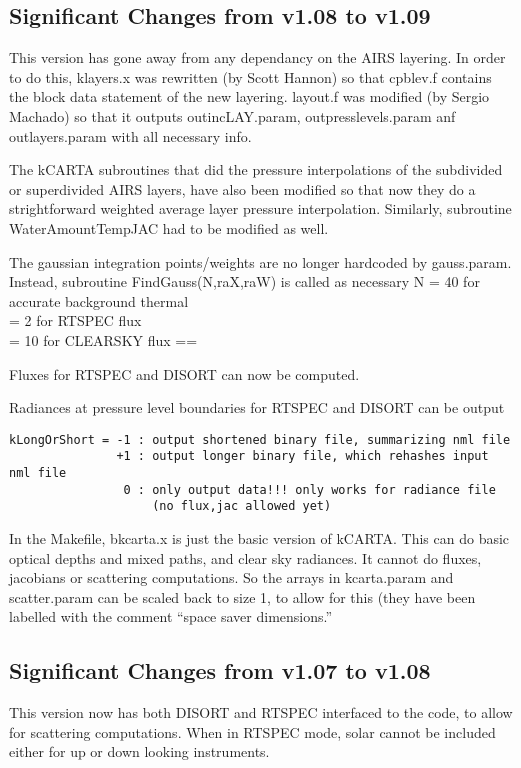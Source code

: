 \documentclass[12pt]{article}
\begin{document}
{{{{\subsection{Significant Changes from v1.08 to v1.09}
This version has gone away from any dependancy on the AIRS layering. In order 
to do this, klayers.x was rewritten (by Scott Hannon) so that cpblev.f 
contains the block data statement of the new layering. layout.f was modified 
(by Sergio Machado) so that it outputs outincLAY.param, outpresslevels.param 
anf outlayers.param with all necessary info. 
 
The kCARTA subroutines that did the pressure interpolations of the subdivided 
or superdivided AIRS layers, have also been modified so that now they do a  
strightforward weighted average layer pressure interpolation. 
 Similarly, subroutine WaterAmountTempJAC had to be modified as well. 
 
The gaussian integration points/weights are no longer hardcoded by 
gauss.param. Instead, subroutine FindGauss(N,raX,raW) is called as necessary 
N = 40  for accurate background thermal  \\
  = 2   for RTSPEC flux \\
  = 10  for CLEARSKY flux ==
 
Fluxes for RTSPEC and DISORT can now be computed. 
 
Radiances at pressure level boundaries for RTSPEC and DISORT can be output 

\begin{verbatim}
kLongOrShort = -1 : output shortened binary file, summarizing nml file 
               +1 : output longer binary file, which rehashes input nml file 
                0 : only output data!!! only works for radiance file  
                    (no flux,jac allowed yet) 
\end{verbatim}
 
In the Makefile, bkcarta.x is just the basic version of kCARTA. This can do  
basic optical depths and mixed paths, and clear sky radiances. It cannot 
do fluxes, jacobians or scattering computations. So the arrays in kcarta.param 
and scatter.param can be scaled back to size 1, to allow for this (they have
been labelled with the comment ``space saver dimensions.''

\subsection{Significant Changes from v1.07 to v1.08}
This version now has both DISORT and RTSPEC interfaced to the code, to allow 
for scattering computations. When in RTSPEC mode, solar cannot be included
either for up or down looking instruments. 

}}}}
\end{document}
